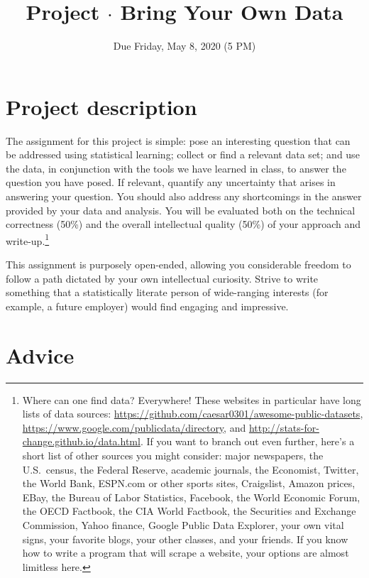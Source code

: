 \documentclass{mynotes}
\title[Project $\cdot$ ECO 395M]{Project $\cdot$ Bring Your Own Data}
\date{Due Friday, May 8, 2020 (5 PM)}  %
\begin{document}
\maketitle%


\section{Project description}

The assignment for this project is simple: pose an interesting question that can be addressed using statistical learning; collect or find a relevant data set; and use the data, in conjunction with the tools we have learned in class, to answer the question you have posed.  If relevant, quantify any uncertainty that arises in answering your question.  You should also address any shortcomings in the answer provided by your data and analysis.   You will be evaluated both on the technical correctness (50\%) and the overall intellectual quality (50\%) of your approach and write-up.\footnote{Where can one find data?  Everywhere!  These websites in particular have long lists of data sources: \url{https://github.com/caesar0301/awesome-public-datasets}, \url{https://www.google.com/publicdata/directory}, and  \url{http://stats-for-change.github.io/data.html}.   If you want to branch out even further, here's a short list of other sources you might consider: major newspapers, the U.S.~census, the Federal Reserve, academic journals, the Economist, Twitter, the World Bank, ESPN.com or other sports sites, Craigslist, Amazon prices, EBay, the Bureau of Labor Statistics, Facebook, the World Economic Forum, the OECD Factbook, the CIA World Factbook, the Securities and Exchange Commission, Yahoo finance, Google Public Data Explorer,  your own vital signs, your favorite blogs, your other classes, and your friends.  If you know how to write a program that will scrape a website, your options are almost limitless here. }

This assignment is purposely open-ended, allowing you considerable freedom to follow a path dictated by your own intellectual curiosity.  Strive to write something that a statistically literate person of wide-ranging interests (for example, a future employer) would find engaging and impressive.

\section{Advice}
\end{document}
